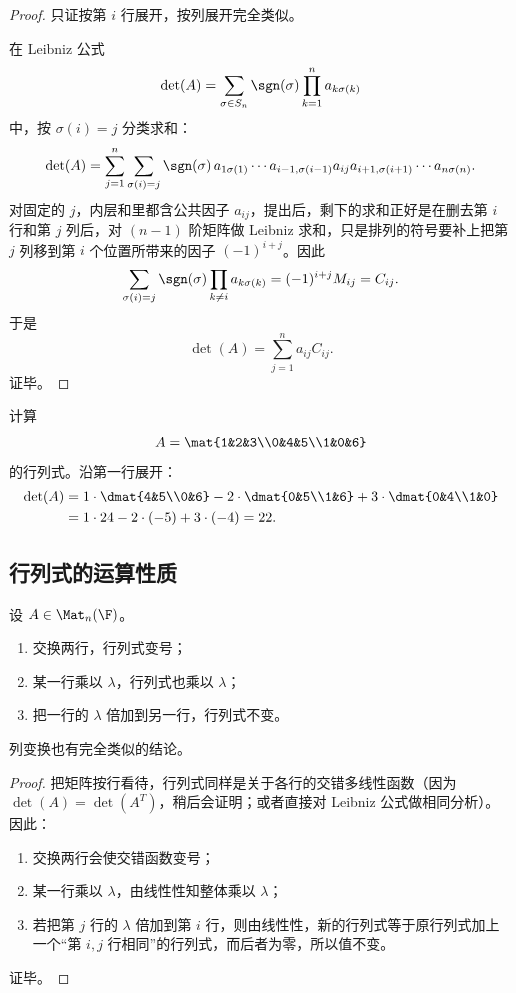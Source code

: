 \begin{proof}
只证按第 $i$ 行展开，按列展开完全类似。

在 Leibniz 公式
\[
\det(A)=\sum_{\sigma\in S_n}\sgn(\sigma)\prod_{k=1}^n a_{k\sigma(k)}
\]
中，按 $\sigma(i)=j$ 分类求和：
\[
\det(A)=\sum_{j=1}^n\sum_{\sigma(i)=j}\sgn(\sigma)\,a_{1\sigma(1)}\cdots a_{i-1,\sigma(i-1)}a_{ij}a_{i+1,\sigma(i+1)}\cdots a_{n\sigma(n)}.
\]
对固定的 $j$，内层和里都含公共因子 $a_{ij}$，提出后，剩下的求和正好是在删去第 $i$ 行和第 $j$ 列后，对 $(n-1)$ 阶矩阵做 Leibniz 求和，只是排列的符号要补上把第 $j$ 列移到第 $i$ 个位置所带来的因子 $(-1)^{i+j}$。因此
\[
\sum_{\sigma(i)=j}\sgn(\sigma)\prod_{k\ne i}a_{k\sigma(k)}=(-1)^{i+j}M_{ij}=C_{ij}.
\]
于是
\[
\det(A)=\sum_{j=1}^n a_{ij}C_{ij}.
\]
证毕。
\end{proof}

\begin{example}
计算
\[
A=\mat{1&2&3\\0&4&5\\1&0&6}
\]
的行列式。沿第一行展开：
\begin{align*}
\det(A)
&=1\cdot\dmat{4&5\\0&6}-2\cdot\dmat{0&5\\1&6}+3\cdot\dmat{0&4\\1&0}\\
&=1\cdot 24-2\cdot(-5)+3\cdot(-4)=22.
\end{align*}
\end{example}

\subsection{行列式的运算性质}

\begin{proposition}[对初等行变换的反应]
设 $A\in\Mat_n(\F)$。
\begin{enumerate}[label=(\arabic*)]
  \item 交换两行，行列式变号；
  \item 某一行乘以 $\lambda$，行列式也乘以 $\lambda$；
  \item 把一行的 $\lambda$ 倍加到另一行，行列式不变。
\end{enumerate}
列变换也有完全类似的结论。
\end{proposition}

\begin{proof}
把矩阵按行看待，行列式同样是关于各行的交错多线性函数（因为 $\det(A)=\det(A^T)$，稍后会证明；或者直接对 Leibniz 公式做相同分析）。因此：
\begin{enumerate}[label=(\arabic*)]
  \item 交换两行会使交错函数变号；
  \item 某一行乘以 $\lambda$，由线性性知整体乘以 $\lambda$；
  \item 若把第 $j$ 行的 $\lambda$ 倍加到第 $i$ 行，则由线性性，新的行列式等于原行列式加上一个“第 $i,j$ 行相同”的行列式，而后者为零，所以值不变。
\end{enumerate}
证毕。
\end{proof}

